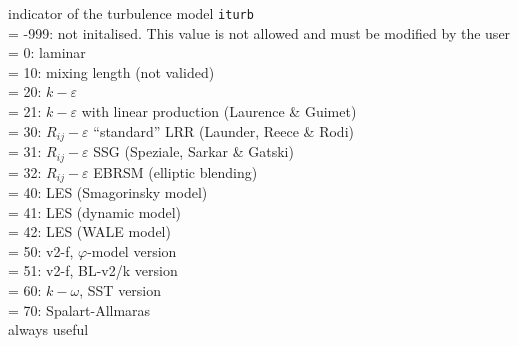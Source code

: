 {indicator of the turbulence model {\tt iturb}\\
\hspace*{1.3cm}= -999: not initalised. This value is not allowed and
must be modified by the user\\
\hspace*{1.3cm}= 0: laminar\\
\hspace*{1.3cm}= 10: mixing length (not valided)\\
\hspace*{1.3cm}= 20: $k-\varepsilon$\\
\hspace*{1.3cm}= 21: $k-\varepsilon$ with linear production (Laurence \& Guimet)\\
\hspace*{1.3cm}= 30: $R_{ij}-\varepsilon$ ``standard'' LRR (Launder, Reece \& Rodi)\\
\hspace*{1.3cm}= 31: $R_{ij}-\varepsilon$ SSG (Speziale, Sarkar \& Gatski)\\
\hspace*{1.3cm}= 32: $R_{ij}-\varepsilon$ EBRSM (elliptic blending)\\
\hspace*{1.3cm}= 40: LES (Smagorinsky model) \\
\hspace*{1.3cm}= 41: LES (dynamic model) \\
\hspace*{1.3cm}= 42: LES (WALE model) \\
\hspace*{1.3cm}= 50: v2-f, $\varphi$-model version\\
\hspace*{1.3cm}= 51: v2-f, BL-v2/k version\\
\hspace*{1.3cm}= 60: $k-\omega$, SST version \\
\hspace*{1.3cm}= 70: Spalart-Allmaras \\
always useful}

